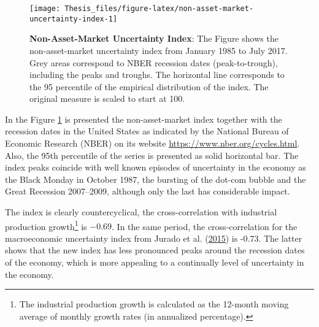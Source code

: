 \documentclass[12pt,twoside]{reedthesis}
\begin{document}
\begin{figure}

{\centering \texttt{[image: Thesis\_files/figure-latex/non-asset-market-uncertainty-index-1]} 

}

\caption[Non-Asset-Market Uncertainty Index]{\textbf{Non-Asset-Market Uncertainty Index}: The Figure shows the non-asset-market uncertainty index from January 1985 to July 2017. Grey areas correspond to NBER recession dates (peak-to-trough), including the peaks and troughs. The horizontal line corresponds to the 95 percentile of the empirical distribution of the index. The original measure is scaled to start at 100.}\label{fig:non-asset-market-uncertainty-index}
\end{figure}
In the Figure \ref{fig:non-asset-market-uncertainty-index} is presented the non-asset-market index together with the recession dates in the United States as indicated by the National Bureau of Economic Research (NBER) on its website \url{https://www.nber.org/cycles.html}. Also, the 95th percentile of the series is presented as solid horizontal bar. The index peaks coincide with well known episodes of uncertainty in the economy as the Black Monday in October 1987, the bursting of the dot-com bubble and the Great Recession 2007--2009, although only the last has considerable impact.

The index is clearly countercyclical, the cross-correlation with industrial production growth\footnote{The industrial production growth is calculated as the 12-month moving average of monthly growth rates (in annualized percentage).} is \(-0.69\). In the same period, the cross-correlation for the macroeconomic uncertainty index from Jurado et al. (\protect\hyperlink{ref-juraetal:2015}{2015}) is -0.73. The latter shows that the new index has less pronounced peaks around the recession dates of the economy, which is more appealing to a continually level of uncertainty in the economy.
\end{document}
